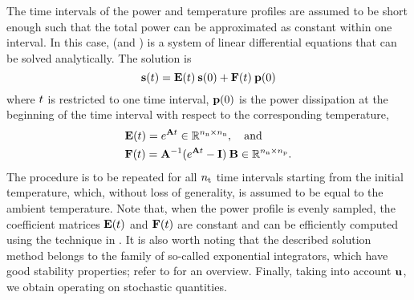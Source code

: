 The time intervals of the power and temperature profiles are assumed to be short enough such that the total power can be approximated as constant within one interval.
In this case,  (and ) is a system of linear differential equations that can be solved analytically.
The solution is \cite{ukhov2012}
\begin{equation} \elabel{ode-solution}
  \vS(\t) = \mCF(\t) \: \vS(0) + \mCS(\t) \: \vP(0)
\end{equation}
where $t$ is restricted to one time interval, $\mathbf{p}(0)$ is the power dissipation at the beginning of the time interval with respect to the corresponding temperature,
\begin{align*}
  & \mCF(\t) = e^{\mA \t} \in \real^{\nnodes \times \nnodes}, \hspace{1em} \text{and} \\
  & \mCS(\t) = \mA^{-1} (e^{\mA \t} - \mI) \: \mB \in \real^{\nnodes \times \nprocs}.
\end{align*}
The procedure is to be repeated for all ${n_\text{t}}$ time intervals starting from the initial temperature, which, without loss of generality, is assumed to be equal to the ambient temperature.
Note that, when the power profile is evenly sampled, the coefficient matrices $\mCF(\t)$ and $\mCS(\t)$ are constant and can be efficiently computed using the technique in \cite{ukhov2012}.
It is also worth noting that the described solution method belongs to the family of so-called exponential integrators, which have good stability properties; refer to \cite{hochbruck2010} for an overview.
Finally, taking into account $\mathbf{u}$, we obtain  operating on stochastic quantities.
